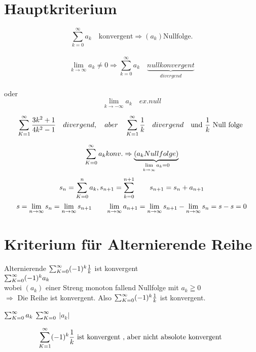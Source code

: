 \section{Hauptkriterium}  
$$\sum_{k=0}^{\infty}{a_k} \quad \text{konvergent}
 \Rightarrow (a_k) \text{Nullfolge.}$$ \\
$$\lim\limits_{k \rightarrow \infty}{a_k} \neq 0 \Rightarrow  \sum_{k=0}^{\infty}{a_k} \quad \underbrace{null konvergent }_{divergend}$$\\
oder
			$$\lim\limits_{k \rightarrow -\infty}{ a_k} \quad ex.null$$

						\begin{example}
						
						\[ \sum_{K=1}^{\infty} \frac{3k^2+1}{4k^2-1} \quad divergend, \quad aber \quad \sum_{K=1}^{\infty} \frac{1}{k} \quad divergend \quad \text{und $\frac{1}{k}$ Null folge }  \]
						

						\end{example}
\begin{beweis}
\[  \sum_{K=0}^{\infty} a_k konv. \Rightarrow \underbrace{(a_k Nullfolge) }_{\lim\limits_{k \rightarrow \infty} a_k=0}  \] 
\[s_n =\sum_{K=0}^{n} a_k , s_{n+1} =\sum_{k=0}^{n+1} \qquad s_{n+1}=s_n + a_{n+1} \]
\[s= \lim\limits_{n \rightarrow \infty} s_n= \lim\limits_{n \rightarrow \infty} s_{n+1} \qquad \lim\limits_{n \rightarrow \infty} a_{n+1} = \lim\limits_{n \rightarrow \infty} s_{n+1} - \lim\limits_{n \rightarrow \infty} s_n = s-s=0 \]
\end{beweis}

\newpage
\section{Kriterium für Alternierende  Reihe}
\begin{beweis}{Alternierende }
	$\sum_{K=0}^{\infty} (-1)^k \frac{1}{k}$ ist konvergent\\
	$\sum_{K=0}^{\infty} (-1)^k a_k$\\
	wobei $(a_k)$ einer Streng monoton fallend Nullfolge mit $a_k \geqq 0 $ \\
	$\Rightarrow$ Die Reihe ist konvergent. Also $\sum_{K=0}^{\infty} (-1)^k \frac{1}{k}$ ist konvergent.

\end{beweis}
\begin{definition}
	
	 $\sum_{K=0}^{\infty}  a_k$   $\sum_{K=0}^{\infty} $ $|a_k|$ 
\end{definition}
\begin{example}

\[	\sum_{K=1}^{\infty} (-1)^k \frac{1}{k} \text{ ist konvergent , aber nicht absolote konvergent } \]
\end{example}

